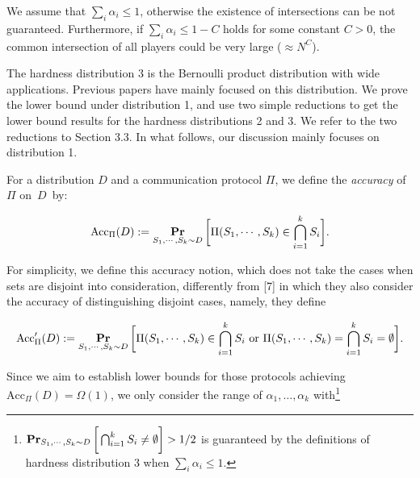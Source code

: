 We assume that $\sum_{i}\alpha_{i}\leq 1$, otherwise the existence of intersections can be not guaranteed. Furthermore, if $\sum_{i}\alpha_{i}\leq 1-C$ holds for some constant $C>0$, the common intersection of all players could be very large ($\approx N^{C}$).\par




The hardness distribution 3 is the Bernoulli product distribution with wide applications. Previous papers have mainly focused on this distribution. We prove the lower bound under distribution 1, and use two simple reductions to get the lower bound results for the hardness distributions 2 and 3. We refer to the two reductions to Section 3.3. In what follows, our discussion mainly focuses on distribution 1.\par




For a distribution $D$ and a communication protocol $\Pi$, we define the \emph{accuracy} of $\Pi$ on $D$ by:\par


\[\begin{gathered}
\text{Acc}_{\Pi}(D):=\operatorname*{\mathbf{Pr}}_{S_{1},\cdots,S_{k}\sim D}\bigg{[}\Pi(S_{1},\cdots,S_{k})\in\bigcap_{i=1}^{k}S_{i}\bigg{]}.
\end{gathered}\]




For simplicity, we define this accuracy notion, which does not take the cases when sets are disjoint into consideration, differently from [7] in which they also consider the accuracy of distinguishing disjoint cases, namely, they define\par


\[\begin{gathered}
\text{Acc}^{\prime}_{\Pi}(D):=\operatorname*{\mathbf{Pr}}_{S_{1},\cdots,S_{k}\sim D}\bigg{[}\Pi(S_{1},\cdots,S_{k})\in\bigcap_{i=1}^{k}S_{i}\text{ or }\Pi(S_{1},\cdots,S_{k})=\bigcap_{i=1}^{k}S_{i}=\emptyset\bigg{]}.
\end{gathered}\]


Since we aim to establish lower bounds for those protocols achieving $\text{Acc}_{\Pi}(D)=\Omega(1)$, we only consider the range of $\alpha_{1},\dots,\alpha_{k}$ with\footnote{$\operatorname*{\mathbf{Pr}}_{S_{1},\cdots,S_{k}\sim D}\bigg{[}\bigcap_{i=1}^{k}S_{i}\neq\emptyset\bigg{]}>1/2$ is guaranteed by the definitions of hardness distribution 3 when $\sum_{i}\alpha_{i}\leq 1$.}\par


